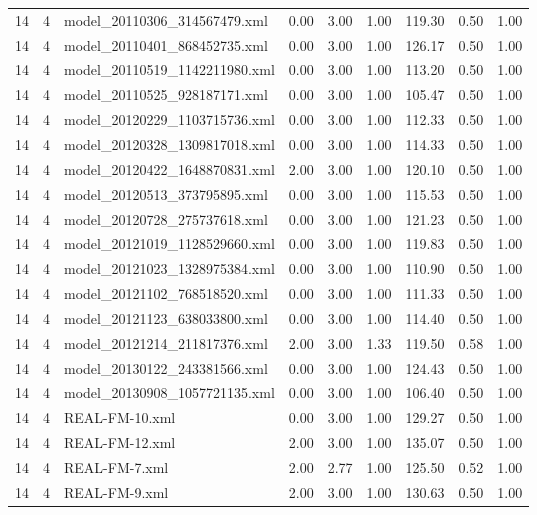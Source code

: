 \begin{table}[ht]
\begin{tabular}{rrlrrrrrr}
   14 &   4 & model\_20110306\_314567479.xml & 0.00 & 3.00 & 1.00 & 119.30 & 0.50 & 1.00 \\ 
   14 &   4 & model\_20110401\_868452735.xml & 0.00 & 3.00 & 1.00 & 126.17 & 0.50 & 1.00 \\ 
   14 &   4 & model\_20110519\_1142211980.xml & 0.00 & 3.00 & 1.00 & 113.20 & 0.50 & 1.00 \\ 
   14 &   4 & model\_20110525\_928187171.xml & 0.00 & 3.00 & 1.00 & 105.47 & 0.50 & 1.00 \\ 
   14 &   4 & model\_20120229\_1103715736.xml & 0.00 & 3.00 & 1.00 & 112.33 & 0.50 & 1.00 \\ 
   14 &   4 & model\_20120328\_1309817018.xml & 0.00 & 3.00 & 1.00 & 114.33 & 0.50 & 1.00 \\ 
   14 &   4 & model\_20120422\_1648870831.xml & 2.00 & 3.00 & 1.00 & 120.10 & 0.50 & 1.00 \\ 
   14 &   4 & model\_20120513\_373795895.xml & 0.00 & 3.00 & 1.00 & 115.53 & 0.50 & 1.00 \\ 
   14 &   4 & model\_20120728\_275737618.xml & 0.00 & 3.00 & 1.00 & 121.23 & 0.50 & 1.00 \\ 
   14 &   4 & model\_20121019\_1128529660.xml & 0.00 & 3.00 & 1.00 & 119.83 & 0.50 & 1.00 \\ 
   14 &   4 & model\_20121023\_1328975384.xml & 0.00 & 3.00 & 1.00 & 110.90 & 0.50 & 1.00 \\ 
   14 &   4 & model\_20121102\_768518520.xml & 0.00 & 3.00 & 1.00 & 111.33 & 0.50 & 1.00 \\ 
   14 &   4 & model\_20121123\_638033800.xml & 0.00 & 3.00 & 1.00 & 114.40 & 0.50 & 1.00 \\ 
   14 &   4 & model\_20121214\_211817376.xml & 2.00 & 3.00 & 1.33 & 119.50 & 0.58 & 1.00 \\ 
   14 &   4 & model\_20130122\_243381566.xml & 0.00 & 3.00 & 1.00 & 124.43 & 0.50 & 1.00 \\ 
   14 &   4 & model\_20130908\_1057721135.xml & 0.00 & 3.00 & 1.00 & 106.40 & 0.50 & 1.00 \\ 
   14 &   4 & REAL-FM-10.xml & 0.00 & 3.00 & 1.00 & 129.27 & 0.50 & 1.00 \\ 
   14 &   4 & REAL-FM-12.xml & 2.00 & 3.00 & 1.00 & 135.07 & 0.50 & 1.00 \\ 
   14 &   4 & REAL-FM-7.xml & 2.00 & 2.77 & 1.00 & 125.50 & 0.52 & 1.00 \\ 
   14 &   4 & REAL-FM-9.xml & 2.00 & 3.00 & 1.00 & 130.63 & 0.50 & 1.00 \\ 

\end{tabular}
\end{table}
